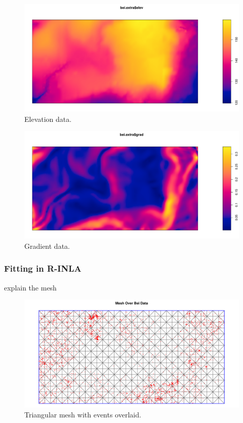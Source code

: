 \documentclass[]{interact}
\begin{document}
\begin{figure}[h]
\includegraphics[width=\textwidth]{figures/beielev.pdf}
\caption{Elevation data.}
\label{beielev}
\end{figure}

\begin{figure}[h]
\includegraphics[width=\textwidth]{figures/beigrad.pdf}
\caption{Gradient data.}
\label{beigrad}
\end{figure}


\subsubsection{Fitting in R-INLA}

explain the mesh

\begin{figure}[h]
\includegraphics[width=\textwidth]{figures/beimesh.pdf}
\caption{Triangular mesh with events overlaid.}
\label{beimesh}
\end{figure}
\end{document}
